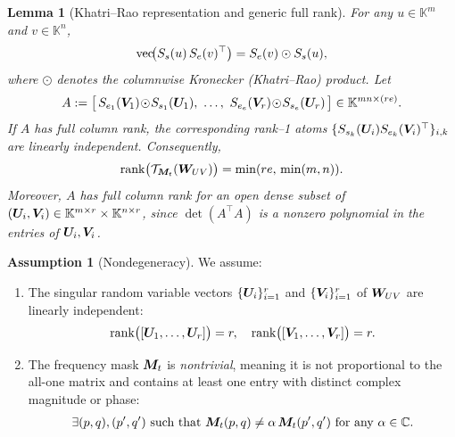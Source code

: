 \documentclass{article}
\theoremstyle{plain}
\newtheorem{lemma}[theorem]{Lemma}
\theoremstyle{definition}
\newtheorem{assumption}[theorem]{Assumption}
\theoremstyle{remark}
\begin{document}
\begin{lemma}[Khatri--Rao representation and generic full rank]
\label{lem:khatri-rao}
For any $u\in\mathbb{K}^m$ and $v\in\mathbb{K}^n$,
\begin{align}
  \mathrm{vec}\!\big(S_s(u)\,S_e(v)^\top\big)
  = S_e(v) \odot S_s(u), \notag
\end{align}
where $\odot$ denotes the columnwise Kronecker (Khatri--Rao) product.
Let
\begin{align}
A
  := \big[\,S_{e_1}({\bm{V}}_1)\!\odot\!S_{s_1}({\bm{U}}_1),~
   \dots,~
   S_{e_e}({\bm{V}}_r)\!\odot\!S_{s_e}({\bm{U}}_r)\,\big]
   \in\mathbb{K}^{mn\times (r e)}. \notag
\end{align}
If $A$ has full column rank, the corresponding rank--1 atoms 
$\{S_{s_k}({\bm{U}}_i)S_{e_k}({\bm{V}}_i)^\top\}_{i,k}$ are linearly independent. Consequently,
\begin{align}
  \operatorname{rank}\!\big(\mathcal{T}_{{\bm{M}}_t}({\bm{W}}_{UV})\big)
  = \min(re,\,\min(m,n)). \notag
\end{align}
Moreover, $A$ has full column rank for an open dense subset of $({\bm{U}}_i,{\bm{V}}_i)\in\mathbb{K}^{m\times r}\times\mathbb{K}^{n\times r}$, since $\det(A^\top A)$ is a nonzero polynomial in the entries of ${\bm{U}}_i,{\bm{V}}_i$.
\end{lemma}

\begin{assumption}[Nondegeneracy]
\label{assump:nondegeneracy}
We assume:
\begin{enumerate}
    \item The singular random variable vectors $\{{\bm{U}}_i\}_{i=1}^r$ and $\{{\bm{V}}_i\}_{i=1}^r$ of ${\bm{W}}_{UV}$ are linearly independent:
    \begin{align}
        \mathrm{rank}\big([{\bm{U}}_1,\dots,{\bm{U}}_r]\big) = r, \quad 
        \mathrm{rank}\big([{\bm{V}}_1,\dots,{\bm{V}}_r]\big) = r. \notag
    \end{align}
    \item The frequency mask ${\bm{M}}_t$ is \emph{nontrivial}, meaning it is not proportional to the all-one matrix and contains at least one entry with distinct complex magnitude or phase:
    \begin{align}
        \exists (p,q),(p',q') \text{ such that } 
        {\bm{M}}_t(p,q) \neq \alpha\, {\bm{M}}_t(p',q') \text{ for any } \alpha \in \mathbb{C}. \notag
    \end{align}
\end{enumerate}
\end{assumption}
\end{document}
